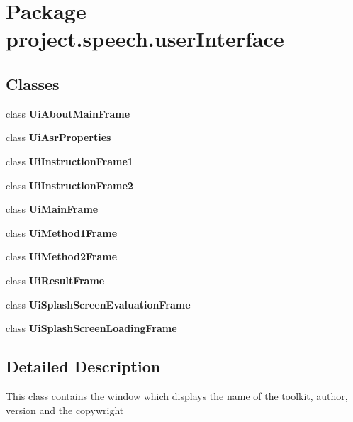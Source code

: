 \section{Package project.\+speech.\+user\+Interface}
\label{namespaceproject_1_1speech_1_1user_interface}
\subsection*{Classes}
\begin{DoxyCompactItemize}
\item 
class {\bf Ui\+About\+Main\+Frame}
\item 
class {\bf Ui\+Asr\+Properties}
\item 
class {\bf Ui\+Instruction\+Frame1}
\item 
class {\bf Ui\+Instruction\+Frame2}
\item 
class {\bf Ui\+Main\+Frame}
\item 
class {\bf Ui\+Method1\+Frame}
\item 
class {\bf Ui\+Method2\+Frame}
\item 
class {\bf Ui\+Result\+Frame}
\item 
class {\bf Ui\+Splash\+Screen\+Evaluation\+Frame}
\item 
class {\bf Ui\+Splash\+Screen\+Loading\+Frame}
\end{DoxyCompactItemize}


\subsection{Detailed Description}
This class contains the window which displays the name of the toolkit, author, version and the copywright 